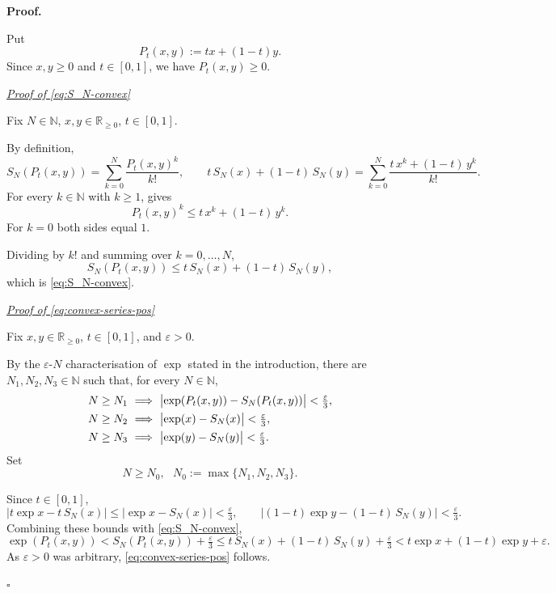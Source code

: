 \documentclass[11pt,reqno]{amsart}
\providecommand{\R}{\mathbb{R}}
\providecommand{\N}{\mathbb{N}}
\theoremstyle{redplain}
\renewcommand{\qedsymbol}{\textcolor{proofqed}{\ensuremath{\square}}}
\renewenvironment{proof}[1][Proof]{\par\noindent\textbf{\textcolor{proofhead}{#1.}}\par\nobreak}{\par\nobreak\hfill\qedsymbol}
\numberwithin{equation}{section}
\begin{document}
\begin{proof}
\noindent Put 
\begin{equation*}
P_{t}(x,y):=tx+(1-t)y.
\end{equation*}%
Since $x,y\geq 0$ and $t\in [0,1]$, we have $P_{t}(x,y)\geq 0$.

\noindent \underline{{\large \emph{Proof of \cref{eq:S_N-convex} }}}

\noindent Fix $N\in \N$, $x,y\in \R_{\geq 0}$, $t\in [0,1]$.

By definition, 
\begin{equation*}
S_{N}(P_{t}(x,y))=\sum_{k=0}^{N}\frac{P_{t}(x,y)^{k}}{k!},\qquad
t\,S_{N}(x)+(1-t)\,S_{N}(y)=\sum_{k=0}^{N}\frac{t\,x^{k}+(1-t)\,y^{k}}{k!}.
\end{equation*}%
For every $k\in \N$ with $k\geq 1$,  gives 
\begin{equation*}
P_{t}(x,y)^{k}\leq t\,x^{k}+(1-t)\,y^{k}.
\end{equation*}%
For $k=0$ both sides equal $1$.

Dividing by $k!$ and summing over $k=0,\dots ,N$, 
\begin{equation*}
S_{N}(P_{t}(x,y))\leq t\,S_{N}(x)+(1-t)\,S_{N}(y),
\end{equation*}%
which is \cref{eq:S_N-convex}.

\noindent \underline{{\large \emph{Proof of \cref{eq:convex-series-pos} }}}

\noindent Fix $x,y\in \R_{\geq 0}$, $t\in [0,1]$, and $\varepsilon >0$.

By the $\varepsilon $-$N$ characterisation of $\exp $ stated in the
introduction, there are $N_{1},N_{2},N_{3}\in \N$ such that, for every $N\in %
\N$, 
\begin{align*}
N\geq N_{1}\ & \Longrightarrow \ \bigl|\exp (P_{t}(x,y))-S_{N}(P_{t}(x,y))%
\bigr|<\tfrac{\varepsilon }{3}, \\
N\geq N_{2}\ & \Longrightarrow \ \bigl|\exp (x)-S_{N}(x)\bigr|<\tfrac{%
\varepsilon }{3}, \\
N\geq N_{3}\ & \Longrightarrow \ \bigl|\exp (y)-S_{N}(y)\bigr|<\tfrac{%
\varepsilon }{3}.
\end{align*}%
Set 
\begin{equation*}
N\geq N_{0},\text{ \ \ }N_{0}:=\max \{N_{1},N_{2},N_{3}\}.
\end{equation*}

Since $t\in [0,1]$, 
\begin{equation*}
\bigl|t\exp x-t\,S_{N}(x)\bigr|\leq |\exp x-S_{N}(x)|<\tfrac{\varepsilon }{3}%
,\qquad \bigl|(1-t)\exp y-(1-t)\,S_{N}(y)\bigr|<\tfrac{\varepsilon }{3}.
\end{equation*}%
Combining these bounds with \cref{eq:S_N-convex}, 
\begin{equation*}
\exp (P_{t}(x,y))<S_{N}(P_{t}(x,y))+\tfrac{\varepsilon }{3}\leq
t\,S_{N}(x)+(1-t)\,S_{N}(y)+\tfrac{\varepsilon }{3}<t\exp x+(1-t)\exp
y+\varepsilon .
\end{equation*}%
As $\varepsilon >0$ was arbitrary, \cref{eq:convex-series-pos} follows.
\end{proof}
\end{document}
